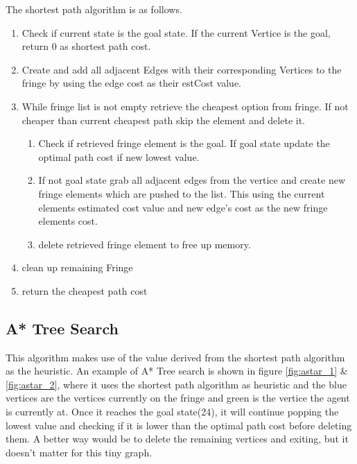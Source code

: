 The shortest path algorithm is as follows.
\begin{enumerate}
\item Check if current state is the goal state. If the current Vertice is the
	goal, return 0 as shortest path cost.
\item Create and add all adjacent Edges with their corresponding Vertices to the
	fringe by using the edge cost as their estCost value.
\item While fringe list is not empty retrieve the cheapest option from fringe.
	If not cheaper than current cheapest path skip the element and delete it.
\begin{enumerate}
\item Check if retrieved fringe element is the goal.  If goal state update the
	optimal path cost if new lowest value.
\item	If not goal state grab all adjacent edges from the vertice and create new
	fringe elements which are pushed to the list.  This using the current elements
	estimated cost value and new edge's cost as the new fringe elements cost.
\item delete retrieved fringe element to free up memory.
\end{enumerate}
\item clean up remaining Fringe
\item return the cheapest path cost
\end{enumerate}


\subsection{A* Tree Search}
This algorithm makes use of the value derived from the shortest path algorithm
as the heuristic.  An example of A* Tree search is shown in figure
\ref{fig:astar_1} \& \ref{fig:astar_2}, where it uses the shortest path
algorithm as heuristic and the blue vertices are the vertices currently on the
fringe and green is the vertice the agent is currently at. Once it reaches the
goal state(24), it will continue popping the lowest value and checking if it is
lower than the optimal path cost before deleting them. A better way would be to
delete the remaining vertices and exiting, but it doesn't matter for this tiny
graph.


